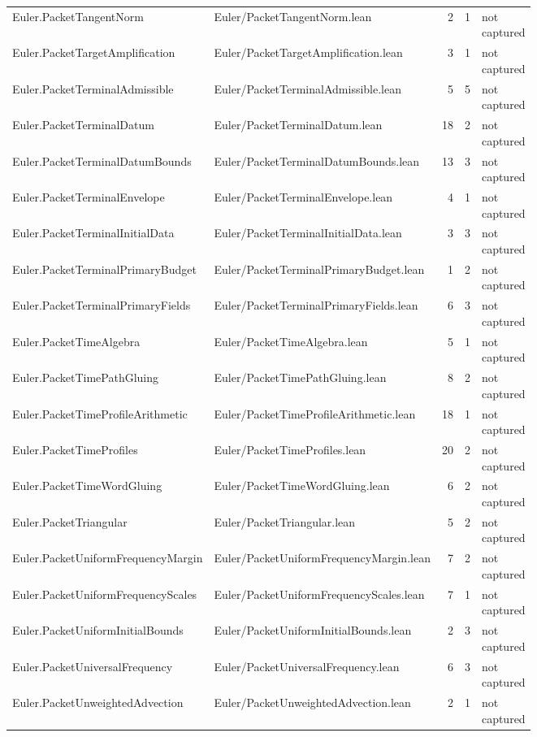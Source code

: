 \documentclass[10pt]{article}
\begin{document}
\begin{longtable}{p{0.28\linewidth}p{0.27\linewidth}r r p{0.20\linewidth}}
Euler.PacketTangentNorm & Euler/PacketTangentNorm.lean & 2 & 1 & not captured\\
Euler.PacketTargetAmplification & Euler/PacketTargetAmplification.lean & 3 & 1 & not captured\\
Euler.PacketTerminalAdmissible & Euler/PacketTerminalAdmissible.lean & 5 & 5 & not captured\\
Euler.PacketTerminalDatum & Euler/PacketTerminalDatum.lean & 18 & 2 & not captured\\
Euler.PacketTerminalDatumBounds & Euler/PacketTerminalDatumBounds.lean & 13 & 3 & not captured\\
Euler.PacketTerminalEnvelope & Euler/PacketTerminalEnvelope.lean & 4 & 1 & not captured\\
Euler.PacketTerminalInitialData & Euler/PacketTerminalInitialData.lean & 3 & 3 & not captured\\
Euler.PacketTerminalPrimaryBudget & Euler/PacketTerminalPrimaryBudget.lean & 1 & 2 & not captured\\
Euler.PacketTerminalPrimaryFields & Euler/PacketTerminalPrimaryFields.lean & 6 & 3 & not captured\\
Euler.PacketTimeAlgebra & Euler/PacketTimeAlgebra.lean & 5 & 1 & not captured\\
Euler.PacketTimePathGluing & Euler/PacketTimePathGluing.lean & 8 & 2 & not captured\\
Euler.PacketTimeProfileArithmetic & Euler/PacketTimeProfileArithmetic.lean & 18 & 1 & not captured\\
Euler.PacketTimeProfiles & Euler/PacketTimeProfiles.lean & 20 & 2 & not captured\\
Euler.PacketTimeWordGluing & Euler/PacketTimeWordGluing.lean & 6 & 2 & not captured\\
Euler.PacketTriangular & Euler/PacketTriangular.lean & 5 & 2 & not captured\\
Euler.PacketUniformFrequencyMargin & Euler/PacketUniformFrequencyMargin.lean & 7 & 2 & not captured\\
Euler.PacketUniformFrequencyScales & Euler/PacketUniformFrequencyScales.lean & 7 & 1 & not captured\\
Euler.PacketUniformInitialBounds & Euler/PacketUniformInitialBounds.lean & 2 & 3 & not captured\\
Euler.PacketUniversalFrequency & Euler/PacketUniversalFrequency.lean & 6 & 3 & not captured\\
Euler.PacketUnweightedAdvection & Euler/PacketUnweightedAdvection.lean & 2 & 1 & not captured\\

\end{longtable}
\end{document}
